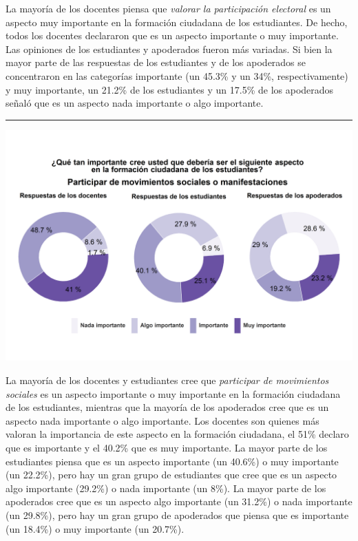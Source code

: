 \documentclass[
  14pt,
]{book}
\let\origfigure\figure
\let\endorigfigure\endfigure
\renewenvironment{figure}[1][2] {
  \expandafter\origfigure\expandafter[H]
} {
  \endorigfigure
}
\begin{document}
La mayoría de los docentes piensa que \emph{valorar la participación electoral} es un aspecto muy importante en la formación ciudadana de los estudiantes. De hecho, todos los docentes declararon que es un aspecto importante o muy importante. Las opiniones de los estudiantes y apoderados fueron más variadas. Si bien la mayor parte de las respuestas de los estudiantes y de los apoderados se concentraron en las categorías importante (un 45.3\% y un 34\%, respectivamente) y muy importante, un 21.2\% de los estudiantes y un 17.5\% de los apoderados señaló que es un aspecto nada importante o algo importante.

\begin{center}\rule{0.5\linewidth}{0.5pt}\end{center}

\begin{figure}[!ht]

{\centering \includegraphics[width=0.8\linewidth,]{images/graph_for_ciud4} 

}

\caption{Relevancia de los movimientos sociales}\label{fig:unnamed-chunk-28}
\end{figure}

La mayoría de los docentes y estudiantes cree que \emph{participar de movimientos sociales} es un aspecto importante o muy importante en la formación ciudadana de los estudiantes, mientras que la mayoría de los apoderados cree que es un aspecto nada importante o algo importante. Los docentes son quienes más valoran la importancia de este aspecto en la formación ciudadana, el 51\% declaro que es importante y el 40.2\% que es muy importante. La mayor parte de los estudiantes piensa que es un aspecto importante (un 40.6\%) o muy importante (un 22.2\%), pero hay un gran grupo de estudiantes que cree que es un aspecto algo importante (29.2\%) o nada importante (un 8\%). La mayor parte de los apoderados cree que es un aspecto algo importante (un 31.2\%) o nada importante (un 29.8\%), pero hay un gran grupo de apoderados que piensa que es importante (un 18.4\%) o muy importante (un 20.7\%).
\end{document}
